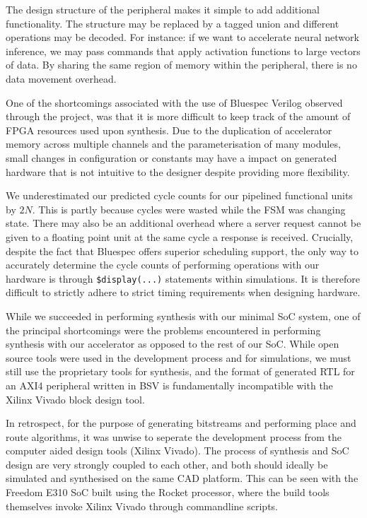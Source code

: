 \documentclass[a4paper,8pt]{report}
\begin{document}
The design structure of the peripheral makes it simple to add additional
functionality. The structure may be replaced by a tagged union and different
operations may be decoded. For instance: if we want to accelerate neural network
inference, we may pass commands that apply activation functions to large vectors
of data. By sharing the same region of memory within the peripheral, there is no
data movement overhead. 

One of the shortcomings associated with the use of Bluespec Verilog observed
through the project, was that it is more difficult to keep track of the amount
of FPGA resources used upon synthesis. Due to the duplication of accelerator
memory across multiple channels and the parameterisation of many modules, small
changes in configuration or constants may have a impact on generated hardware
that is not intuitive to the designer despite providing more flexibility.

We underestimated our predicted cycle counts for our pipelined functional units
by $2N$. This is partly because cycles were wasted while the FSM was changing
state. There may also be an additional overhead where a server request cannot be
given to a floating point unit at the same cycle a response is received.
Crucially, despite the fact that Bluespec offers superior scheduling support,
the only way to accurately determine the cycle counts of performing operations
with our hardware is through \texttt{\$display(...)} statements within
simulations. It is therefore difficult to strictly adhere to strict timing
requirements when designing hardware.

While we succeeded in performing synthesis with our minimal SoC system, one of
the principal shortcomings were the problems encountered in performing synthesis
with our accelerator as opposed to the rest of our SoC. While open source tools
were used in the development process and for simulations, we must still use the
proprietary tools for synthesis, and the format of generated RTL for an AXI4
peripheral written in BSV is fundamentally incompatible with the Xilinx Vivado
block design tool.

In retrospect, for the purpose of generating bitstreams and performing place and
route algorithms, it was unwise to seperate the development process from
the computer aided design tools (Xilinx Vivado). The process of synthesis and
SoC design are very strongly coupled to each other, and both should ideally be
simulated and synthesised on the same CAD platform. This can be seen with the
Freedom E310 SoC built using the Rocket processor, where the build tools
themselves invoke Xilinx Vivado through commandline scripts.
\end{document}
